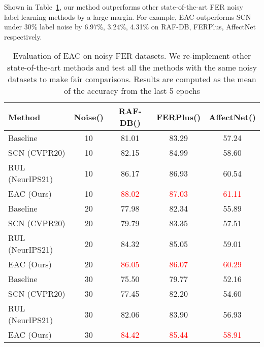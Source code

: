 \documentclass[runningheads]{llncs}
\begin{document}
Shown in Table~\ref{table:label noise}, our method outperforms other state-of-the-art FER noisy label learning methods by a large margin. For example, EAC outperforms SCN under 30\% label noise by 6.97\%, 3.24\%, 4.31\% on RAF-DB, FERPlus, AffectNet respectively. 

\begin{table}[!t]
\setlength{\tabcolsep}{3.2pt}
\begin{center}
\caption{Evaluation of EAC on noisy FER datasets. We re-implement other state-of-the-art methods and test all the methods with the same noisy datasets to make fair comparisons. Results are computed as the mean of the accuracy from the last 5 epochs}
\label{table:label noise}
\begin{tabular}{lcccc}
\hline
Method    & Noise() & RAF-DB()            & FERPlus()         & AffectNet()        \\ \hline
Baseline  & 10    &        81.01              &      83.29                &           57.24           \\
SCN (CVPR20)       & 10    &   82.15                  &      84.99              &         58.60             \\
RUL (NeurIPS21)     & 10    &  86.17 & 86.93 & 60.54 \\
EAC (Ours)     & 10    &         \textcolor{red}{88.02}             &     \textcolor{red}{87.03}               &      \textcolor{red}{61.11}                \\ \hline
Baseline  & 20    & 77.98 & 82.34 & 55.89 \\
SCN (CVPR20)    & 20    &   79.79                   &       83.35              &       57.51               \\

RUL (NeurIPS21)     & 20    &       84.32               &    85.05                  &      59.01                \\
EAC (Ours)    & 20    &      \textcolor{red}{86.05}                &      \textcolor{red}{86.07}                &     \textcolor{red}{60.29}                 \\ \hline
Baseline  & 30    &     75.50                 &       79.77               &      52.16                \\
SCN (CVPR20)     & 30    &   77.45                   &     82.20                 &       54.60               \\

RUL (NeurIPS21)     & 30    & 82.06 & 83.90 & 56.93 \\
EAC (Ours)     & 30    &       \textcolor{red}{84.42}              &      \textcolor{red}{85.44}                 &   \textcolor{red}{58.91}                  \\ \hline
\end{tabular}
\end{center}
\end{table}
\end{document}
